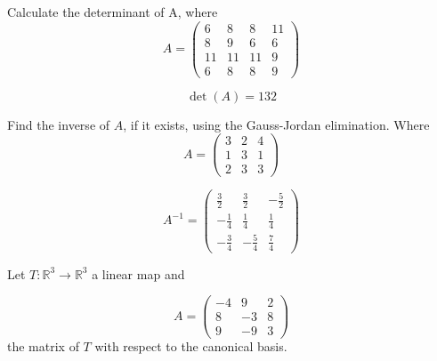\begin{questions}

\question Calculate the determinant of A, where
$$
A=\left(\begin{array}{rrrr}
6 & 8 & 8 & 11 \\
8 & 9 & 6 & 6 \\
11 & 11 & 11 & 9 \\
6 & 8 & 8 & 9
\end{array}\right)
$$

\begin{solution}
$$\det(A)=132$$
\end{solution}

\question Find the inverse of $A$, if it exists, using the Gauss-Jordan elimination. Where
$$
A=\left(\begin{array}{rrr}
3 & 2 & 4 \\
1 & 3 & 1 \\
2 & 3 & 3
\end{array}\right)
$$

\begin{solution}
$$A^{-1}=\left(\begin{array}{rrr}
\frac{3}{2} & \frac{3}{2} & -\frac{5}{2} \\
-\frac{1}{4} & \frac{1}{4} & \frac{1}{4} \\
-\frac{3}{4} & -\frac{5}{4} & \frac{7}{4}
\end{array}\right)$$
\end{solution}

\question Let $T:\mathbb{R}^3\rightarrow\mathbb{R}^3$  a linear map and
 
$$
A=\left(\begin{array}{rrr}
-4 & 9 & 2 \\
8 & -3 & 8 \\
9 & -9 & 3
\end{array}\right)
$$
the matrix of $T$ with respect to the canonical basis.
\end{questions}

